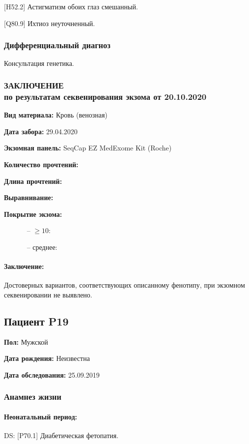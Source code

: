 \documentclass[a4paper,14pt]{extarticle}
\newcommand{\mln}{млн}
\newcommand{\DS}[2]{[#2] #1}
\begin{document}
\DS{Астигматизм обоих глаз смешанный}{H52.2}. 

\DS{Ихтиоз неуточненный}{Q80.9}.

\subsubsection*{Дифференциальный диагноз}

Консультация генетика.

\subsubsection*{ЗАКЛЮЧЕНИЕ\\по результатам секвенирования экзома от 20.10.2020}

\textbf{Вид материала:} Кровь (венозная)

\textbf{Дата забора:} 29.04.2020

\textbf{Экзомная панель:} SeqCap EZ MedExome Kit (Roche)

\textbf{Количество прочтений:} \numprint[\mln]{20.9}

\textbf{Длина прочтений:} 

\textbf{Выравнивание:} 

\textbf{Покрытие экзома:}

~~~~~~ -- $\geqslant10$: 

~~~~~~ -- среднее: 

\paragraph{Заключение:} Достоверных вариантов, соответствующих описанному фенотипу, при экзомном секвенировании не выявлено.

\newpage
\subsection*{Пациент P19}

\textbf{Пол:} Мужской

\textbf{Дата рождения:} Неизвестна

\textbf{Дата обследования:} 25.09.2019

\subsubsection*{Анамнез жизни}

\paragraph{Неонатальный период:} DS: \DS{Диабетическая фетопатия}{P70.1}.
\end{document}
